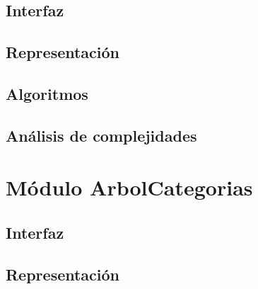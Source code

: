 \documentclass[12pt, a4paper]{article}
\begin{document}
\subsection{Interfaz}

\subsection{Representaci\'on}

\subsection{Algoritmos}

\subsection{Análisis de complejidades}

\newpage

% 
% 
% 
% 
\newpage

\section{Módulo ArbolCategorias} 
\subsection{Interfaz}

\subsection{Representaci\'on}

\end{document}
